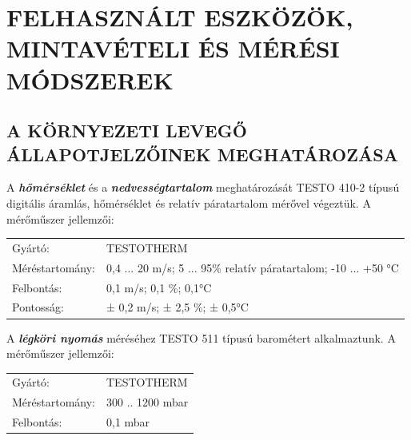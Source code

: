 \documentclass[a4paper,12pt]{article}
\begin{document}
	
	\newpage
	\section{FELHASZNÁLT ESZKÖZÖK, MINTAVÉTELI ÉS MÉRÉSI MÓDSZEREK}
	\subsection{A KÖRNYEZETI LEVEGŐ ÁLLAPOTJELZŐINEK MEGHATÁROZÁSA}
	
		\begin{adjustwidth}{1cm}{0cm}
			A \textbf{\textit{hőmérséklet}} és a \textbf{\textit{nedvességtartalom}} meghatározását TESTO 410-2 típusú digitális
			áramlás, hőmérséklet és relatív páratartalom mérővel végeztük. A mérőműszer
			jellemzői:
			
			\vspace{1.0em} %
			\noindent
			\centering 
			\begin{tabular}{ p{5.5cm} p{8cm} } 
				Gyártó: & TESTOTHERM \\
				Méréstartomány: & 0,4 ... 20 m/s; 5 ... 95\% relatív páratartalom;
				-10 ... +50 °C \\
				Felbontás: & 0,1 m/s; 0,1 \%; 0,1°C \\
				Pontosság: & ± 0,2 m/s; ± 2,5 \%; ± 0,5°C \\
			\end{tabular}
		\end{adjustwidth}
	
		\begin{adjustwidth}{1cm}{0cm}
			\vspace{1.0em} %
			A \textbf{\textit{légköri nyomás}} méréséhez TESTO 511 típusú barométert alkalmaztunk. A mérőműszer jellemzői:
			
			\vspace{1.0em} %
			\noindent
			\centering 
			\begin{tabular}{ p{5.5cm} p{8cm} } 
				Gyártó: & TESTOTHERM \\
				Méréstartomány: & 300 .. 1200 mbar \\
				Felbontás: & 0,1 mbar \\
			\end{tabular}
			
		\end{adjustwidth}
	
\end{document}
